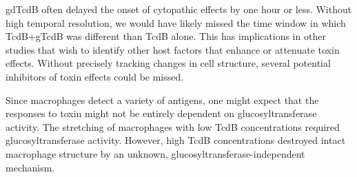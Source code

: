 gdTcdB often delayed the onset of cytopathic effects 
by one hour or less. Without high temporal resolution, 
we would have likely missed the time window in which 
TcdB+gTcdB was different than TcdB alone. This has 
implications in other studies that wish to identify 
other host factors that enhance or attenuate toxin 
effects. Without precisely tracking changes in cell 
structure, several potential inhibitors of toxin 
effects could be missed.

Since macrophages detect a variety of antigens, 
one might expect that the responses to toxin might 
not be entirely dependent on glucosyltransferase activity.
The stretching of macrophages with low TcdB 
concentrations required glucosyltransferase activity. 
However, high TcdB concentrations destroyed intact 
macrophage structure by an unknown, 
glucosyltransferase-independent mechanism.

